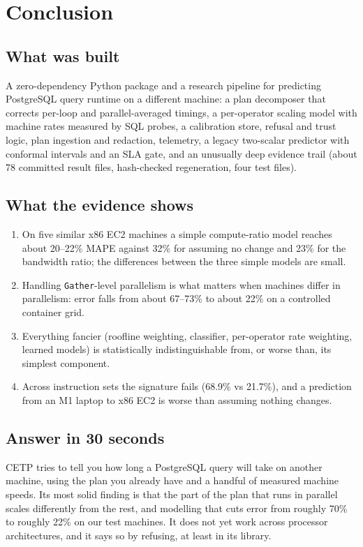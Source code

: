 \chapter{Conclusion}\label{ch:conclusion}

\section{What was built}
A zero-dependency Python package and a research pipeline for predicting PostgreSQL query runtime on a different machine: a plan decomposer that corrects per-loop and parallel-averaged timings, a per-operator scaling model with machine rates measured by SQL probes, a calibration store, refusal and trust logic, plan ingestion and redaction, telemetry, a legacy two-scalar predictor with conformal intervals and an SLA gate, and an unusually deep evidence trail (about 78 committed result files, hash-checked regeneration, four test files).

\section{What the evidence shows}
\begin{enumerate}
\item On five similar x86 EC2 machines a simple compute-ratio model reaches about 20--22\% MAPE against 32\% for assuming no change and 23\% for the bandwidth ratio; the differences between the three simple models are small.
\item Handling \texttt{Gather}-level parallelism is what matters when machines differ in parallelism: error falls from about 67--73\% to about 22\% on a controlled container grid.
\item Everything fancier (roofline weighting, classifier, per-operator rate weighting, learned models) is statistically indistinguishable from, or worse than, its simplest component.
\item Across instruction sets the signature fails (68.9\% vs 21.7\%), and a prediction from an M1 laptop to x86 EC2 is worse than assuming nothing changes.
\end{enumerate}

\section{Answer in 30 seconds}
CETP tries to tell you how long a PostgreSQL query will take on another machine, using the plan you already have and a handful of measured machine speeds. Its most solid finding is that the part of the plan that runs in parallel scales differently from the rest, and modelling that cuts error from roughly 70\% to roughly 22\% on our test machines. It does not yet work across processor architectures, and it says so by refusing, at least in its library.

